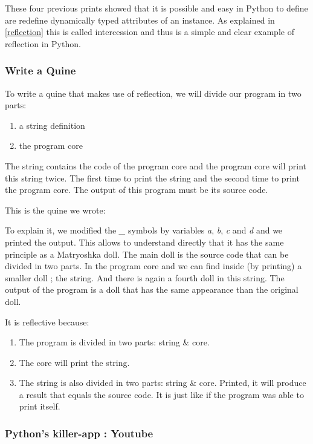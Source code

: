 These four previous prints showed that it is possible and easy in Python to define are redefine dynamically typed attributes of an instance. As explained in \ref{reflection} this is called intercession and thus is a  simple and clear example of reflection in Python.\\

\subsubsection{Write a Quine}
To write a quine that makes use of reflection, we will divide our program in two parts:
\begin{enumerate}
    \item a string definition
    \item the program core
\end{enumerate}
The string contains the code of the program core and the program core will print this string twice. The first time to print the string and the second time to print the program core. The output of this program must be its source code.

This is the quine we wrote:


To explain it, we modified the \emph{\_} symbols by variables \emph{a}, \emph{b}, \emph{c} and \emph{d} and we printed the output. This allows to understand directly that it has the same principle as a Matryoshka doll. The main doll is the source code that can be divided in two parts. In the program core and we can find inside (by printing) a smaller doll ; the string. And there is again a fourth doll in this string. The output of the program is a doll that has the same appearance than the original doll.


It is reflective because:
\begin{enumerate}
    \item The program is divided in two parts: string \& core.
    \item The core will print the string.
    \item The string is also divided in two parts: string \& core. Printed, it will produce a result that equals the source code. It is just like if the program was able to print itself. 
\end{enumerate}

\subsubsection{Python's killer-app : Youtube}

